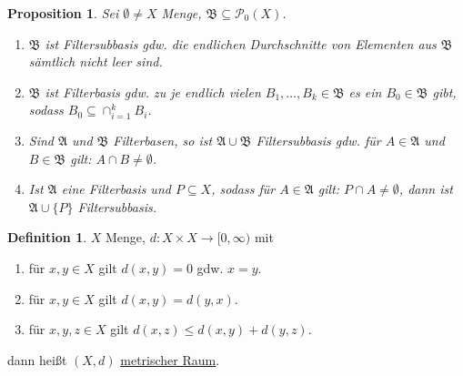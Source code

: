 \documentclass[12pt]{scrartcl}%
\newtheorem{prop}{Proposition}
\theoremstyle{definition}
\newtheorem*{defn}{Definition}
\theoremstyle{remark}
\newcommand{\powerset}{\mathcal{P}}
\begin{document}
\begin{prop}
    Sei $\emptyset\neq X$ Menge, $\mathfrak{B}\subseteq \powerset_0(X)$.

    \begin{enumerate}[label=(\arabic*)]
        \item $\mathfrak{B}$ ist Filtersubbasis gdw. die endlichen Durchschnitte von Elementen aus $\mathfrak{B}$ sämtlich nicht leer sind.
        \item $\mathfrak{B}$ ist Filterbasis gdw. zu je endlich vielen $B_1,\dots,B_k\in\mathfrak{B}$ es ein $B_0\in\mathfrak{B}$ gibt, sodass $B_0\subseteq \cap_{i=1}^k B_i$.
        \item Sind $\mathfrak{A}$ und $\mathfrak{B}$ Filterbasen, so ist $\mathfrak{A} \cup \mathfrak{B}$ Filtersubbasis gdw. für $A\in\mathfrak{A}$ und $B\in\mathfrak{B}$ gilt: $A\cap B \neq \emptyset$.
        \item Ist $\mathfrak{A}$ eine Filterbasis und $P\subseteq X$, sodass für $A\in\mathfrak{A}$ gilt: $P\cap A \neq \emptyset$, dann ist $\mathfrak{A} \cup \{P\}$ Filtersubbasis.
    \end{enumerate}
\end{prop}

\begin{defn}
    $X$ Menge, $d: X\times X\to [0,\infty)$ mit

    \begin{enumerate}[label=(\arabic*)]
        \item für $x,y\in X$ gilt $d(x,y)=0$ gdw. $x=y$.
        \item für $x,y\in X$ gilt $d(x,y)=d(y,x)$.
        \item für $x,y,z\in X$ gilt $d(x,z) \leq d(x,y) + d(y,z)$.
    \end{enumerate}

    dann heißt $(X, d)$ \underline{metrischer Raum}.
\end{defn}
\end{document}
